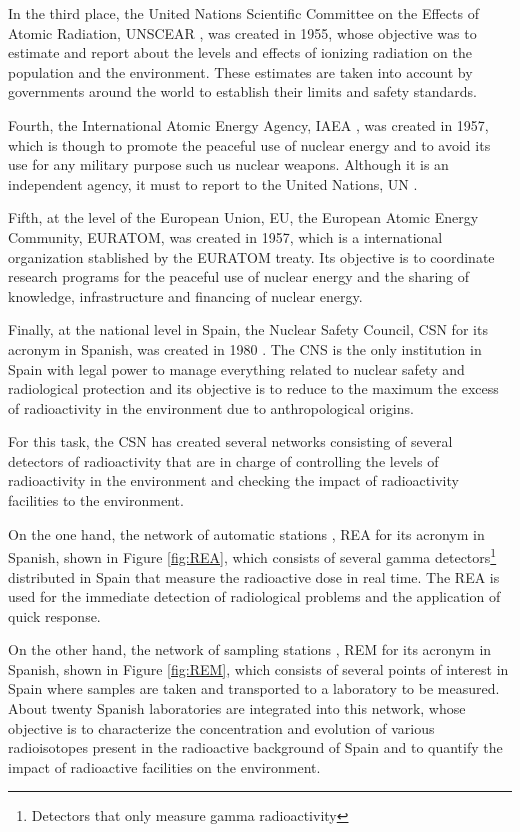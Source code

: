 In the third place, the United Nations Scientific Committee on the Effects of Atomic Radiation, UNSCEAR \cite{UNSCEAR}, was created in 1955, whose objective was to estimate and report about the levels and effects of ionizing radiation on the population and the environment. These estimates are taken into account by governments around the world to establish their limits and safety standards.

Fourth, the International Atomic Energy Agency, IAEA \cite{IAEA}, was created in 1957, which is though to promote the peaceful use of nuclear energy and to avoid its use for any military purpose such us nuclear weapons. Although it is an independent agency, it must to report to the United Nations, UN \cite{UN}.

Fifth, at the level of the European Union, EU, the European Atomic Energy Community, EURATOM, was created in 1957, which is a international organization stablished by the EURATOM treaty. Its objective is to coordinate research programs for the peaceful use of nuclear energy and the sharing of knowledge, infrastructure and financing of nuclear energy.

Finally, at the national level in Spain, the Nuclear Safety Council, CSN for its acronym in Spanish, was created in 1980 \cite{CSN}. The CNS is the only institution in Spain with legal power to manage everything related to nuclear safety and radiological protection and its objective is to reduce to the maximum the excess of radioactivity in the environment due to anthropological origins.

For this task, the CSN has created several networks consisting of several detectors of radioactivity that are in charge of controlling the levels of radioactivity in the environment and checking the impact of radioactivity facilities to the environment.

On the one hand, the network of automatic stations \cite{REA}, REA for its acronym in Spanish, shown in Figure \ref{fig:REA}, which consists of several gamma detectors\footnote{Detectors that only measure gamma radioactivity} distributed in Spain that measure the radioactive dose in real time. The REA is used for the immediate detection of radiological problems and the application of quick response.

On the other hand, the network of sampling stations \cite{REM}, REM for its acronym in Spanish, shown in Figure \ref{fig:REM}, which consists of several points of interest in Spain where samples are taken and transported to a laboratory to be measured. About twenty Spanish laboratories are integrated into this network, whose objective is to characterize the concentration and evolution of various radioisotopes present in the radioactive background of Spain and to quantify the impact of radioactive facilities on the environment.

